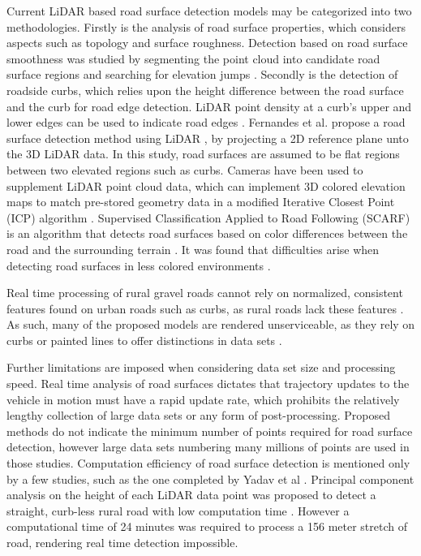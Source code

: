 \documentclass[journal,onecolumn]{IEEEtran}
\begin{document}
	{Current LiDAR based road surface detection models may be categorized into two methodologies. Firstly is the analysis of road surface properties, which considers aspects such as topology and surface roughness. Detection based on road surface smoothness was studied by segmenting the point cloud into candidate road surface regions and searching for elevation jumps \cite{liu_new_2013}. Secondly is the detection of roadside curbs, which relies upon the height difference between the road surface and the curb for road edge detection. LiDAR point density at a curb's upper and lower edges can be used to indicate road edges \cite{ibrahim_curb-based_2012}. Fernandes et al. propose a road surface detection method using LiDAR \cite{fernandes_road_2014}, by projecting a 2D reference plane unto the 3D LiDAR data. In this study, road surfaces are assumed to be flat regions between two elevated regions such as curbs. Cameras have been used to supplement LiDAR point cloud data, which can implement 3D colored elevation maps to match pre-stored geometry data in a modified Iterative Closest Point (ICP) algorithm \cite{manz_detection_2011}. Supervised Classification Applied to Road Following (SCARF) is an algorithm that detects road surfaces based on color differences between the road and the surrounding terrain \cite{crisman_scarf_1993}. It was found that difficulties arise when detecting road surfaces in less colored environments \cite{crisman_scarf_1993,manz_detection_2011}.}
	
	{Real time processing of rural gravel roads cannot rely on normalized, consistent features found on urban roads such as curbs, as rural roads lack these features \cite{skorseth_gravel_nodate}. As such, many of the proposed models are rendered unserviceable, as they rely on curbs or painted lines to offer distinctions in data sets \cite{yadav_extraction_2017,liu_new_2013,qiu_fast_2016,fernandes_road_2014,seker_experiments_nodate,yang_semi-automated_2013,miyazaki_line-based_2014,hervieu_road_2013,smadja_road_nodate}.}
	
	{Further limitations are imposed when considering data set size and processing speed. Real time analysis of road surfaces dictates that trajectory updates to the vehicle in motion must have a rapid update rate, which prohibits the relatively lengthy collection of large data sets or any form of post-processing. Proposed methods \cite{yadav_extraction_2017,yadav_road_2018,yadav_rural_2018,yadav_pole-shaped_2015,miyazaki_line-based_2014,yang_semi-automated_2013,liu_new_2013,qiu_fast_2016} do not indicate the minimum number of points required for road surface detection, however large data sets numbering many millions of points are used in those studies. Computation efficiency of road surface detection is mentioned only by a few studies, such as the one completed by Yadav et al \cite{yadav_road_2018}. Principal component analysis on the height of each LiDAR data point was proposed to detect a straight, curb-less rural road with low computation time \cite{yadav_road_2018}. However a computational time of 24 minutes was required to process a 156 meter stretch of road, rendering real time detection impossible.}
	
\end{document}
